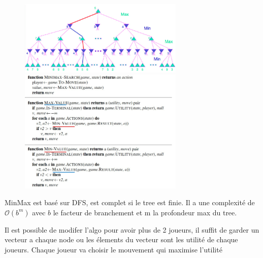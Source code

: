 		\begin{figure}[htp]
			\centering
			\includegraphics[width=0.7\textwidth]{img/exMinMax.png}
			\includegraphics[width=0.7\textwidth]{img/algoMinMax.png}
		\end{figure}
		
		MinMax est basé sur DFS, est complet si le tree est finie. Il a une complexité de $\mathcal{O}(b^m)$ avec $b$ le facteur de branchement et m la profondeur max du tree.
		
		Il est possible de modifer l'algo pour avoir plus de 2 joueurs, il suffit de garder un vecteur a chaque node ou les élements du vecteur sont les utilité de chaque joueurs. Chaque joueur va choisir le mouvement qui maximise l'utilité
		
